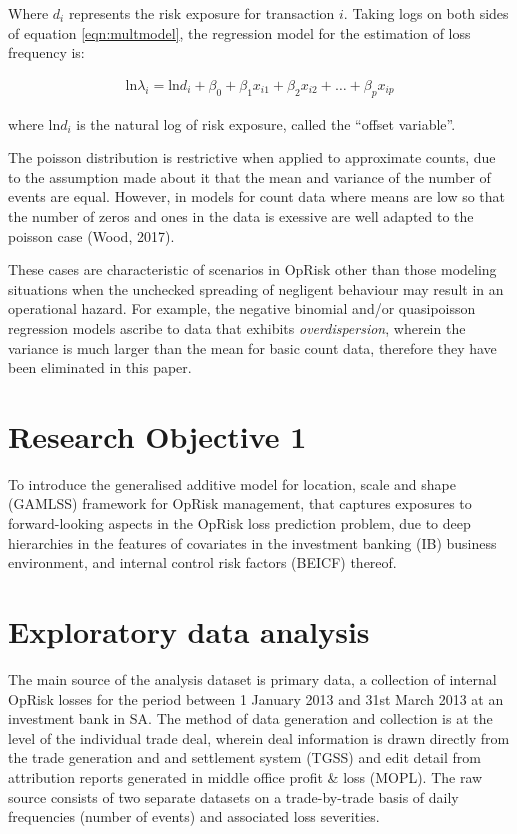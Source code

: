 \documentclass{DissertateUSU}
\begin{document}
Where \(d_i\) represents the risk exposure for transaction \(i\). Taking
logs on both sides of equation \ref{eqn:multmodel}, the regression model
for the estimation of loss frequency is:

\singlespacing

\begin{eqnarray}
\mbox{ln}\lambda_i =  \mbox{ln}d_i + \beta_0 + \beta_1x_{i1} + \beta_2x_{i2} + \ldots + \beta_px_{ip}
\end{eqnarray} \doublespacing

where \(\mbox{ln}d_i\) is the natural log of risk exposure, called the
``offset variable''.\medskip

The poisson distribution is restrictive when applied to approximate
counts, due to the assumption made about it that the mean and variance
of the number of events are equal. However, in models for count data
where means are low so that the number of zeros and ones in the data is
exessive are well adapted to the poisson case (Wood, 2017).\medskip

These cases are characteristic of scenarios in OpRisk other than those
modeling situations when the unchecked spreading of negligent behaviour
may result in an operational hazard. For example, the negative binomial
and/or quasipoisson regression models ascribe to data that exhibits
\emph{overdispersion}, wherein the variance is much larger than the mean
for basic count data, therefore they have been eliminated in this paper.

\section{Research Objective 1}
\label{sec:Research Objective 1}

To introduce the generalised additive model for location, scale and
shape (GAMLSS) framework for OpRisk management, that captures exposures
to forward-looking aspects in the OpRisk loss prediction problem, due to
deep hierarchies in the features of covariates in the investment banking
(IB) business environment, and internal control risk factors (BEICF)
thereof.

\section{Exploratory data analysis}
\label{sec:Exploratory data analysis}

The main source of the analysis dataset is primary data, a collection of
internal OpRisk losses for the period between 1 January 2013 and 31st
March 2013 at an investment bank in SA. The method of data generation
and collection is at the level of the individual trade deal, wherein
deal information is drawn directly from the trade generation and and
settlement system (TGSS) and edit detail from attribution reports
generated in middle office profit \& loss (MOPL). The raw source
consists of two separate datasets on a trade-by-trade basis of daily
frequencies (number of events) and associated loss severities.\medskip
\end{document}

